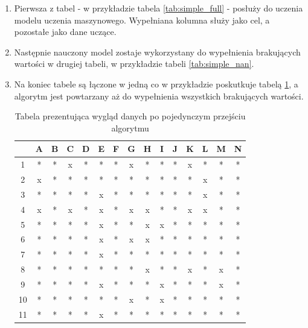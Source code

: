 \documentclass[12pt,twoside]{article}
\begin{document}
\begin{enumerate}[label=\arabic*), leftmargin=1.25cm]
    \item Pierwsza z tabel - w przykładzie tabela \ref{tab:simple_full} - posłuży do uczenia modelu uczenia maszynowego.
    Wypełniana kolumna służy jako cel, a pozostałe jako dane uczące.
    \item Następnie nauczony model zostaje wykorzystany do wypełnienia brakujących wartości w drugiej tabeli,
    w przykładzie tabeli \ref{tab:simple_nan}.
    \item Na koniec tabele są łączone w jedną co w przykładzie poskutkuje tabelą \ref{tab:simple_end},
    a algorytm jest powtarzany aż do wypełnienia wszystkich brakujących wartości.

    \begin{table}[ht]
        \caption{Tabela prezentująca wygląd danych po pojedynczym przejściu algorytmu}
        \centering
            \begin{tabular}{|c|c|c|c|c|c|c|c|c|c|c|c|c|c|c|}
                \hline
                   & A & B & C & D & E & F & G & H & I & J & K & L & M & N \\ \hline
                1  & * & * & x & * & * & * & x & * & * & * & x & * & * & * \\ \hline
                2  & x & * & * & * & * & * & * & * & * & * & * & x & * & * \\ \hline
                3  & * & * & * & * & x & * & * & * & * & * & * & x & * & * \\ \hline
                4  & x & * & x & * & x & * & x & x & * & * & x & x & * & * \\ \hline
                5  & * & * & * & * & x & * & * & x & x & * & * & * & * & * \\ \hline
                6  & * & * & * & * & x & * & x & x & * & * & * & * & * & * \\ \hline
                7  & * & * & * & * & x & * & * & * & * & * & * & * & * & * \\ \hline
                8  & * & * & * & * & * & * & * & x & * & * & x & * & x & * \\ \hline
                9  & * & * & * & * & x & * & * & * & x & * & * & * & x & * \\ \hline
                10 & * & * & * & * & * & * & x & * & x & * & * & * & * & * \\ \hline
                11 & * & * & * & * & x & * & * & * & * & * & * & * & * & * \\ \hline
            \end{tabular}
        \label{tab:simple_end}
        \end{table}
        \FloatBarrier
\end{enumerate}
\end{document}
